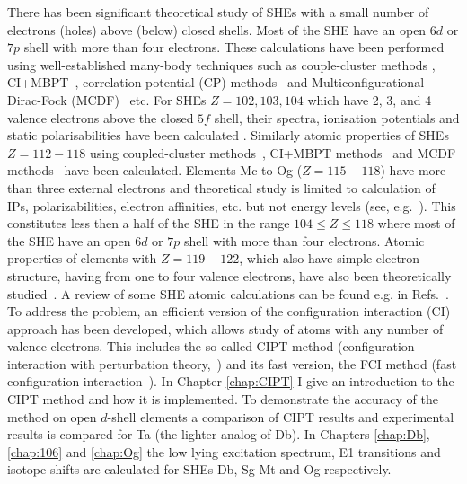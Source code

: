 \documentclass[10pt,a4paper, twoside, openright]{report}
\begin{document}
There has been significant theoretical study of SHEs with a small number of electrons (holes) above (below) closed shells. Most of the SHE have an open $6d$ or $7p$ shell with more than four electrons. These calculations have been performed using well-established many-body techniques such  as couple-cluster methods \cite{Lindgren1986,Blundell1991}, CI+MBPT~\cite{Dzuba1996}, correlation potential (CP) methods~\cite{Dzuba1989} and Multiconfigurational Dirac-Fock (MCDF)~\cite{Grant1988, Fischer2016} etc.  For SHEs $Z=102,103,104$ which have 2, 3, and 4 valence electrons above the  closed $5f$ shell, their spectra, ionisation potentials and static polarisabilities have been calculated \cite{Liu2007,Desclaux1980,Eliav1995,Fritzsche2007,Zou2002, Borschevsky2007,Martin1996,Mosyagin2010, DSS2014, Eliav2015, Kaldor2007, E114b, Dzuba2016}. Similarly atomic properties of SHEs  $Z=112-118$ using  coupled-cluster methods~\cite{pershina2015, DF2016, Eliav2015, Pershina2008, Nash2005,Landau2001,Borschevsky2015, Thierfelder2008,Kaldor2008,Dinh2016,Indelicato2007}, CI+MBPT methods~\cite{Dinh2008, Dzuba1996} and MCDF methods~\cite{Eliav1996, Yu2008} have been calculated.  Elements Mc to Og ($Z=115-118$) have more than three external electrons and theoretical study is limited to calculation of IPs, polarizabilities, electron affinities, etc. but not energy levels (see, e.g.~\cite{Borschevsky2015}). This constitutes less then a half of the SHE in the range $104 \leq Z \leq 118$ where most of the SHE have an open $6d$ or $7p$ shell with more than four electrons. Atomic properties of elements with $Z=119-122$, which also have simple electron structure, having from one to four valence electrons,  have also been theoretically studied~\cite{Landau2001a, Lim2005, Dinh120_2008, DDG2008, Gaigalas2010, Borschevsky2013, Skripnikov2013, Dzuba2013, Ginges2015, Eliav2015}. A review of some SHE atomic calculations can be found  e.g. in Refs.~\cite{Eliav2015,Schwerdtfeger2014, Pershina2009, Pershina2014}.\\
\linebreak
To address the problem,  an efficient version of the configuration interaction (CI) approach has been developed, which allows study of atoms with any number of valence electrons. This includes the so-called CIPT method (configuration interaction with perturbation theory,~\cite{DBHF2017}) and its fast version, the FCI method (fast configuration interaction~\cite{FCI}). In Chapter \ref{chap:CIPT} I give an introduction to the CIPT method and how it is implemented. To demonstrate the accuracy of the method on open $d$-shell elements a comparison of CIPT results and experimental results is compared for Ta (the lighter analog of Db). In Chapters \ref{chap:Db}, \ref{chap:106} and \ref{chap:Og} the low lying excitation spectrum, E1 transitions and isotope shifts are calculated for SHEs Db, Sg-Mt and Og respectively.  
\end{document}
